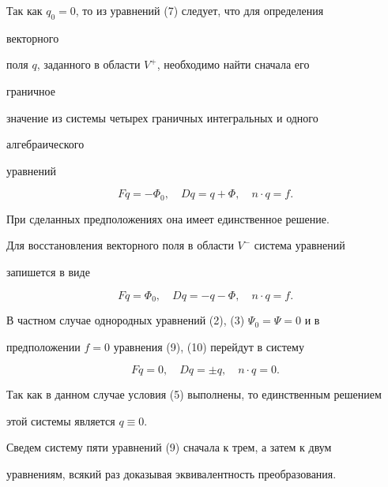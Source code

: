  


Так как $q_0=0$, то из уравнений (7) следует, что для определения 


векторного 


поля $q$, заданного в области $V^+$, необходимо найти сначала его 


граничное 


значение из системы четырех граничных интегральных и одного 


алгебраического  


уравнений 


\begin{equation} 


F q=-\Phi_0,\quad D q=q+\Phi,\quad n\cdot q=f. 


\end{equation} 


При сделанных предположениях она имеет единственное решение. 


 


Для восстановления векторного поля в области $V^-$ система уравнений 


запишется в виде 


\begin{equation} 


F q=\Phi_0,\quad D q=-q-\Phi,\quad n\cdot q=f. 


\end{equation} 





В частном случае однородных уравнений (2), (3) $\Psi_0=\Psi=0$ и в 


предположении $f=0$ уравнения (9), (10) перейдут в систему 


\begin{equation} 


F q=0,\quad D q=\pm q,\quad n\cdot q=0. 


\end{equation} 


Так как в данном случае условия (5) выполнены, то единственным решением  


этой системы является $q\equiv 0$. 


 


Сведем систему пяти уравнений (9) сначала к трем, а затем к двум  


уравнениям, всякий раз доказывая эквивалентность преобразования. 


